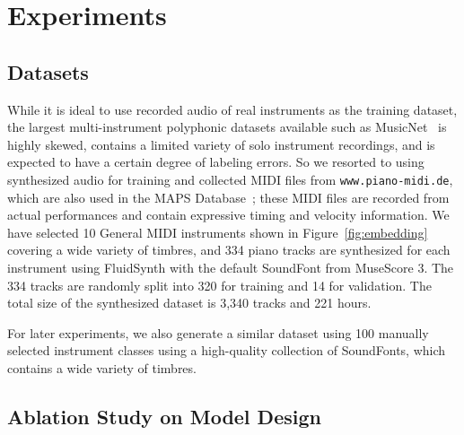 \section{Experiments}\label{sec:experiments}

\subsection{Datasets}

While it is ideal to use recorded audio of real instruments as the training dataset, the largest multi-instrument polyphonic datasets available such as MusicNet~\cite{thickstun2017musicnet} is highly skewed, contains a limited variety of solo instrument recordings, and is expected to have a certain degree of labeling errors.
So we resorted to using synthesized audio for training and collected MIDI files from \texttt{www.piano-midi.de}, which are also used in the MAPS Database~\cite{emiya2010smoothness}; these MIDI files are recorded from actual performances and contain expressive timing and velocity information.
We have selected 10 General MIDI instruments shown in Figure~\ref{fig:embedding} covering a wide variety of timbres, and 334 piano tracks are synthesized for each instrument using FluidSynth with the default SoundFont from MuseScore 3.
The 334 tracks are randomly split into 320 for training and 14 for validation.
The total size of the synthesized dataset is 3,340 tracks and 221 hours.

For later experiments, we also generate a similar dataset using 100 manually selected instrument classes using a high-quality collection of SoundFonts, which contains a wide variety of timbres.


\subsection{Ablation Study on Model Design}

